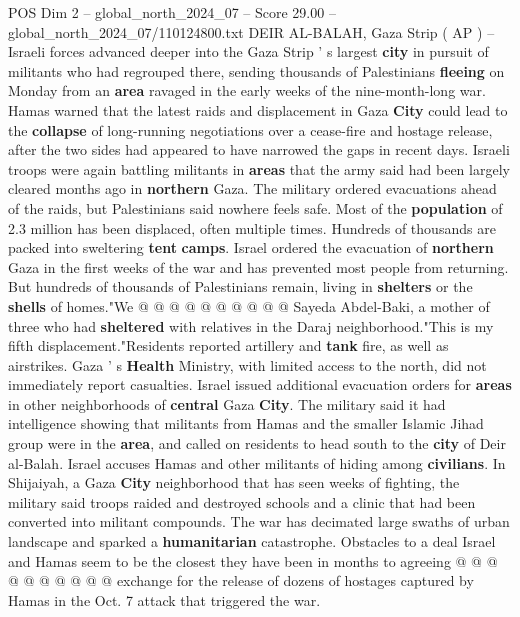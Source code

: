 \begin{textsample}{POS Dim 2 – global\_north\_2024\_07 – Score 29.00 – global\_north\_2024\_07/110124800.txt}  \label{ex:f2_pos_385}
DEIR AL-BALAH, Gaza Strip ( AP ) -- Israeli forces advanced deeper into the Gaza Strip ' s largest \textbf{city} in pursuit of militants who had regrouped there, sending thousands of Palestinians \textbf{fleeing} on Monday from an \textbf{area} ravaged in the early weeks of the nine-month-long war.
Hamas warned that the latest raids and displacement in Gaza \textbf{City} could lead to the \textbf{collapse} of long-running negotiations over a cease-fire and hostage release, after the two sides had appeared to have narrowed the gaps in recent days.
Israeli troops were again battling militants in \textbf{areas} that the army said had been largely cleared months ago in \textbf{northern} Gaza.
The military ordered evacuations ahead of the raids, but Palestinians said nowhere feels safe.
Most of the \textbf{population} of 2.3 million has been displaced, often multiple times.
Hundreds of thousands are packed into sweltering \textbf{tent} \textbf{camps}.
Israel ordered the evacuation of \textbf{northern} Gaza in the first weeks of the war and has prevented most people from returning.
But hundreds of thousands of Palestinians remain, living in \textbf{shelters} or the \textbf{shells} of homes."We @ @ @ @ @ @ @ @ @ @ Sayeda Abdel-Baki, a mother of three who had \textbf{sheltered} with relatives in the Daraj neighborhood."This is my fifth displacement."Residents reported artillery and \textbf{tank} fire, as well as airstrikes.
Gaza ' s \textbf{Health} Ministry, with limited access to the north, did not immediately report casualties.
Israel issued additional evacuation orders for \textbf{areas} in other neighborhoods of \textbf{central} Gaza \textbf{City}.
The military said it had intelligence showing that militants from Hamas and the smaller Islamic Jihad group were in the \textbf{area}, and called on residents to head south to the \textbf{city} of Deir al-Balah.
Israel accuses Hamas and other militants of hiding among \textbf{civilians}.
In Shijaiyah, a Gaza \textbf{City} neighborhood that has seen weeks of fighting, the military said troops raided and destroyed schools and a clinic that had been converted into militant compounds.
The war has decimated large swaths of urban landscape and sparked a \textbf{humanitarian} catastrophe.
Obstacles to a deal Israel and Hamas seem to be the closest they have been in months to agreeing @ @ @ @ @ @ @ @ @ @ exchange for the release of dozens of hostages captured by Hamas in the Oct. 7 attack that triggered the war.

\end{textsample}
